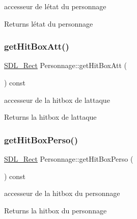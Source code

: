 accesseur de l\textquotesingle{}état du personnage 

\begin{DoxyReturn}{Returns}
l\textquotesingle{}état du personnage 
\end{DoxyReturn}
\mbox{\label{class_personnage_af147a08524f03a17a43a6c6cbb36e7b5}} 
\subsubsection{\texorpdfstring{get\+Hit\+Box\+Att()}{getHitBoxAtt()}}
{\footnotesize\ttfamily \hyperlink{struct_s_d_l___rect}{S\+D\+L\+\_\+\+Rect} Personnage\+::get\+Hit\+Box\+Att (\begin{DoxyParamCaption}{ }\end{DoxyParamCaption}) const}



accesseur de la hitbox de l\textquotesingle{}attaque 

\begin{DoxyReturn}{Returns}
la hitbox de l\textquotesingle{}attaque 
\end{DoxyReturn}
\mbox{\label{class_personnage_afee72d7981842c259a090260b69a474e}} 
\subsubsection{\texorpdfstring{get\+Hit\+Box\+Perso()}{getHitBoxPerso()}}
{\footnotesize\ttfamily \hyperlink{struct_s_d_l___rect}{S\+D\+L\+\_\+\+Rect} Personnage\+::get\+Hit\+Box\+Perso (\begin{DoxyParamCaption}{ }\end{DoxyParamCaption}) const}



accesseur de la hitbox du personnage 

\begin{DoxyReturn}{Returns}
la hitbox du personnage 
\end{DoxyReturn}
\mbox{\label{class_personnage_ae2ddf2bf9d9077de27066d559178617b}} 

